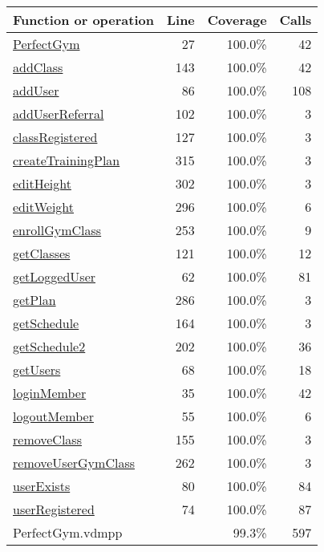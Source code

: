 \begin{longtable}{|l|r|r|r|}
\hline
Function or operation & Line & Coverage & Calls \\
\hline
\hline
\hyperref[PerfectGym:27]{PerfectGym} & 27&100.0\% & 42 \\
\hline
\hyperref[addClass:143]{addClass} & 143&100.0\% & 42 \\
\hline
\hyperref[addUser:86]{addUser} & 86&100.0\% & 108 \\
\hline
\hyperref[addUserReferral:102]{addUserReferral} & 102&100.0\% & 3 \\
\hline
\hyperref[classRegistered:127]{classRegistered} & 127&100.0\% & 3 \\
\hline
\hyperref[createTrainingPlan:315]{createTrainingPlan} & 315&100.0\% & 3 \\
\hline
\hyperref[editHeight:302]{editHeight} & 302&100.0\% & 3 \\
\hline
\hyperref[editWeight:296]{editWeight} & 296&100.0\% & 6 \\
\hline
\hyperref[enrollGymClass:253]{enrollGymClass} & 253&100.0\% & 9 \\
\hline
\hyperref[getClasses:121]{getClasses} & 121&100.0\% & 12 \\
\hline
\hyperref[getLoggedUser:62]{getLoggedUser} & 62&100.0\% & 81 \\
\hline
\hyperref[getPlan:286]{getPlan} & 286&100.0\% & 3 \\
\hline
\hyperref[getSchedule:164]{getSchedule} & 164&100.0\% & 3 \\
\hline
\hyperref[getSchedule2:202]{getSchedule2} & 202&100.0\% & 36 \\
\hline
\hyperref[getUsers:68]{getUsers} & 68&100.0\% & 18 \\
\hline
\hyperref[loginMember:35]{loginMember} & 35&100.0\% & 42 \\
\hline
\hyperref[logoutMember:55]{logoutMember} & 55&100.0\% & 6 \\
\hline
\hyperref[removeClass:155]{removeClass} & 155&100.0\% & 3 \\
\hline
\hyperref[removeUserGymClass:262]{removeUserGymClass} & 262&100.0\% & 3 \\
\hline
\hyperref[userExists:80]{userExists} & 80&100.0\% & 84 \\
\hline
\hyperref[userRegistered:74]{userRegistered} & 74&100.0\% & 87 \\
\hline
\hline
PerfectGym.vdmpp & & 99.3\% & 597 \\
\hline
\end{longtable}

